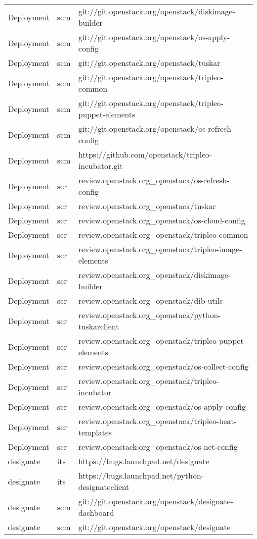 \begin{center}
\begin{longtable}{|p{4cm}|p{1cm}|p{10cm}|}
Deployment&scm&git://git.openstack.org/openstack/diskimage-builder\\ 
Deployment&scm&git://git.openstack.org/openstack/os-apply-config\\ 
Deployment&scm&git://git.openstack.org/openstack/tuskar\\ 
Deployment&scm&git://git.openstack.org/openstack/tripleo-common\\ 
Deployment&scm&git://git.openstack.org/openstack/tripleo-puppet-elements\\ 
Deployment&scm&git://git.openstack.org/openstack/os-refresh-config\\ 
Deployment&scm&https://github.com/openstack/tripleo-incubator.git\\ 
Deployment&scr&review.openstack.org\_openstack/os-refresh-config\\ 
Deployment&scr&review.openstack.org\_openstack/tuskar\\ 
Deployment&scr&review.openstack.org\_openstack/os-cloud-config\\ 
Deployment&scr&review.openstack.org\_openstack/tripleo-common\\ 
Deployment&scr&review.openstack.org\_openstack/tripleo-image-elements\\ 
Deployment&scr&review.openstack.org\_openstack/diskimage-builder\\ 
Deployment&scr&review.openstack.org\_openstack/dib-utils\\ 
Deployment&scr&review.openstack.org\_openstack/python-tuskarclient\\ 
Deployment&scr&review.openstack.org\_openstack/tripleo-puppet-elements\\ 
Deployment&scr&review.openstack.org\_openstack/os-collect-config\\ 
Deployment&scr&review.openstack.org\_openstack/tripleo-incubator\\ 
Deployment&scr&review.openstack.org\_openstack/os-apply-config\\ 
Deployment&scr&review.openstack.org\_openstack/tripleo-heat-templates\\ 
Deployment&scr&review.openstack.org\_openstack/os-net-config\\ 
designate&its&https://bugs.launchpad.net/designate\\ 
designate&its&https://bugs.launchpad.net/python-designateclient\\ 
designate&scm&git://git.openstack.org/openstack/designate-dashboard\\ 
designate&scm&git://git.openstack.org/openstack/designate\\ 

\end{longtable}
\end{center}
